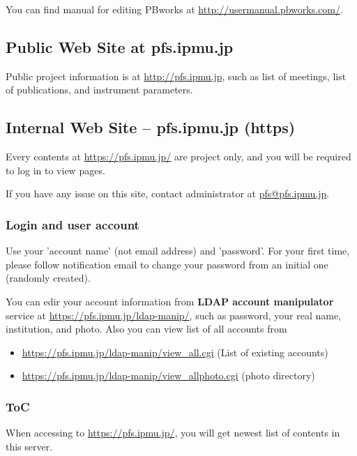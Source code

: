 \documentclass[a4paper,notitlepage]{article}
\begin{document}
You can find manual for editing PBworks at 
\url{http://usermanual.pbworks.com/}. 


\subsection{Public Web Site at pfs.ipmu.jp}

Public project information is at \url{http://pfs.ipmu.jp}, 
such as list of meetings, list of publications, and instrument parameters. 

\subsection{Internal Web Site -- pfs.ipmu.jp (https)}

Every contents at \url{https://pfs.ipmu.jp/} are project only, and you will 
be required to log in to view pages. 

If you have any issue on this site, contact administrator 
at \url{pfs@pfs.ipmu.jp}. 

\subsubsection{Login and user account}

Use your 'account name' (not email address) and 'password'.
For your first time, please follow notification email to change your password 
from an initial one (randomly created). 

You can edir your account information from {\bf LDAP account manipulator} 
service at \url{https://pfs.ipmu.jp/ldap-manip/}, 
such as password, your real name, institution, and photo. 
Also you can view list of all accounts from 

\begin{itemize}
  \item \url{https://pfs.ipmu.jp/ldap-manip/view_all.cgi} (List of existing accounts)
  \item \url{https://pfs.ipmu.jp/ldap-manip/view_allphoto.cgi} (photo directory)
\end{itemize}

\subsubsection{ToC}

When accessing to \url{https://pfs.ipmu.jp/}, you will get newest list of 
contents in this server. 
\end{document}
